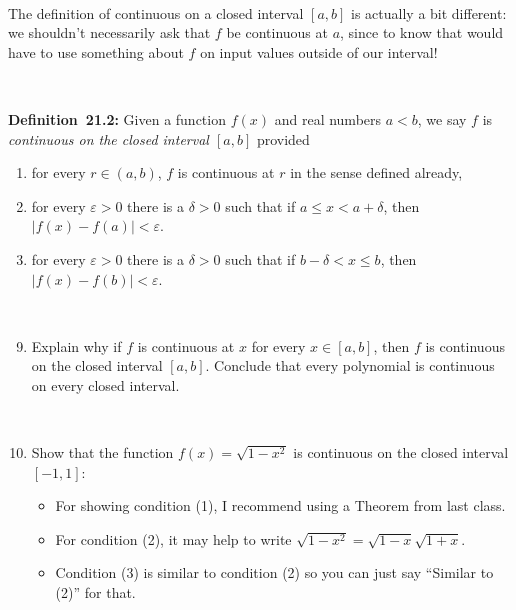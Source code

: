 \documentclass[12pt]{amsart}
\newcommand{\e}{\varepsilon}
\def\d{\delta}
\begin{document}
 \
 
 \begin{framed} 
 \noindent The definition of continuous on a closed interval $[a,b]$ is actually a bit different: we shouldn't necessarily ask that $f$ be continuous at $a$, since to know that would have to use something about $f$ on input values outside of our interval!
 
 \
 
\noindent\textbf{Definition~21.2:}  Given a function $f(x)$ and real numbers $a < b$,
we say $f$ is {\em continuous on the closed interval $[a,b]$} provided 
\begin{enumerate}
\item for every $r \in (a,b)$, $f$ is  continuous at $r$ in the sense defined already,
\item for every $\e > 0$ there is a $\d > 0$ such that if $a \leq x < a+\d$, then ${|f(x)
  - f(a)| < \e}$.
\item for every $\e > 0$ there is a $\d > 0$ such that if $b -\d < x \leq b$, then ${|f(x)
  - f(b)| < \e}$.
\end{enumerate}
\end{framed}

\

 \begin{enumerate}
 \setcounter{enumi}{8}
 \item Explain why if $f$ is continuous at $x$ for every $x\in[a,b]$, then $f$ is continuous on the closed interval $[a,b]$. Conclude that every polynomial is continuous on every closed interval.


\

\item Show that the function $f(x) = \sqrt{1-x^2}$ is continuous on the closed interval $[-1,1]$:
\begin{itemize}
\item For showing condition (1), I recommend using a Theorem from last class. 
\item For condition (2), it may help to write $\sqrt{1-x^2}=\sqrt{1-x}\sqrt{1+x}$. %
\item Condition (3) is similar to condition (2) so you can just say ``Similar to (2)'' for that.
\end{itemize}
   \end{enumerate}
\end{document}
